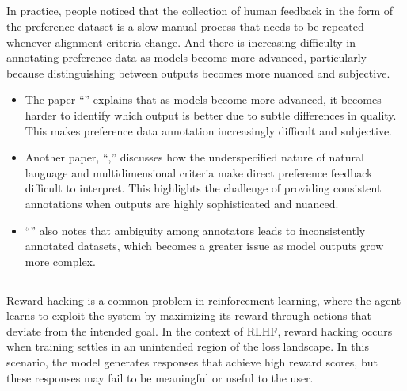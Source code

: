 \documentclass[letterpaper,11pt,english]{sphinxmanual}
\begin{document}
\subsection{}
\label{\detokenize{rlhf:data-collection}}
\sphinxAtStartPar
In practice, people noticed that the collection of human feedback in the
form of the preference dataset is a slow manual process that needs to be
repeated whenever alignment criteria change. And there is increasing
difficulty in annotating preference data as models become more advanced,
particularly because distinguishing between outputs becomes more nuanced
and subjective.
\begin{itemize}
\item {} 
\sphinxAtStartPar
The paper “”
explains that as models become more advanced, it becomes harder to
identify which output is better due to subtle differences in quality.
This makes preference data annotation increasingly difficult and
subjective.

\item {} 
\sphinxAtStartPar
Another paper, “,” discusses how
the underspecified nature of natural language and multidimensional
criteria make direct preference feedback difficult to interpret. This
highlights the challenge of providing consistent annotations when
outputs are highly sophisticated and nuanced.

\item {} 
\sphinxAtStartPar
“” also notes that
ambiguity among annotators leads to inconsistently annotated datasets,
which becomes a greater issue as model outputs grow more complex.

\end{itemize}


\subsection{}
\label{\detokenize{rlhf:reward-hacking}}
\sphinxAtStartPar
Reward hacking is a common problem in reinforcement learning, where the
agent learns to exploit the system by maximizing its reward through
actions that deviate from the intended goal. In the context of RLHF,
reward hacking occurs when training settles in an unintended region of
the loss landscape. In this scenario, the model generates responses that
achieve high reward scores, but these responses may fail to be
meaningful or useful to the user.
\end{document}
